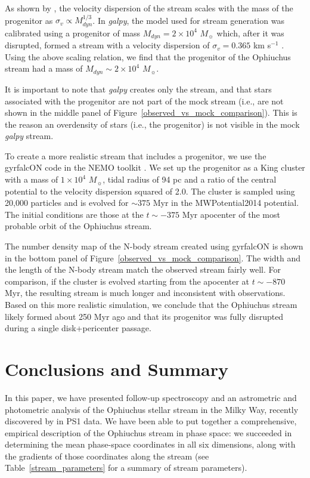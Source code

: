 \documentclass[iop]{emulateapj}
\begin{document}
As shown by \citet{sb13}, the velocity dispersion of the stream scales with the 
mass of the progenitor as $\sigma_v \propto M_{dyn}^{1/3}$. In {\em galpy}, the
model used for stream generation was calibrated using a progenitor of mass
$M_{dyn}=2\times10^4$ $M_\sun$ which, after it was disrupted, formed a stream
with a velocity dispersion of $\sigma_v=0.365$ km s$^{-1}$ \citep{bov14}. Using
the above scaling relation, we find that the progenitor of the Ophiuchus stream
had a mass of $M_{dyn}\sim2\times10^4$ $M_\sun$.

It is important to note that {\em galpy} creates only the stream, and that stars
associated with the progenitor are not part of the mock stream (i.e., are not
shown in the middle panel of Figure~\ref{observed_vs_mock_comparison}). This is
the reason an overdensity of stars (i.e., the progenitor) is not visible in the
mock {\em galpy} stream.

To create a more realistic stream that includes a progenitor, we use the
gyrfalcON code \citep{deh00,deh02} in the NEMO toolkit \citep{teu95}. We set up
the progenitor as a King cluster \citep{kin66} with a mass of $1\times10^4$
$M_\sun$, tidal radius of 94 pc and a ratio of the central potential to the
velocity dispersion squared of 2.0. The cluster is sampled using 20,000
particles and is evolved for $\sim375$ Myr in the MWPotential2014 potential. The
initial conditions are those at the $t\sim-375$ Myr apocenter of the most
probable orbit of the Ophiuchus stream.

The number density map of the N-body stream created using gyrfalcON is shown in
the bottom panel of Figure~\ref{observed_vs_mock_comparison}. The width and the
length of the N-body stream match the observed stream fairly well. For
comparison, if the cluster is evolved starting from the apocenter at
$t\sim-870$ Myr, the resulting stream is much longer and inconsistent with
observations. Based on this more realistic simulation, we conclude that the
Ophiuchus stream likely formed about 250 Myr ago and that its progenitor was
fully disrupted during a single disk+pericenter passage.

\section{Conclusions and Summary}\label{conclusions}

In this paper, we have presented follow-up spectroscopy and an astrometric and
photometric analysis of the Ophiuchus stellar stream in the Milky Way, recently
discovered by \citet{ber14b} in PS1 data. We have been able to put together a
comprehensive, empirical description of the Ophiuchus stream in phase space: we
succeeded in determining the mean phase-space coordinates in all six dimensions,
along with the gradients of those coordinates along the stream (see
Table~\ref{stream_parameters} for a summary of stream parameters).
\end{document}
